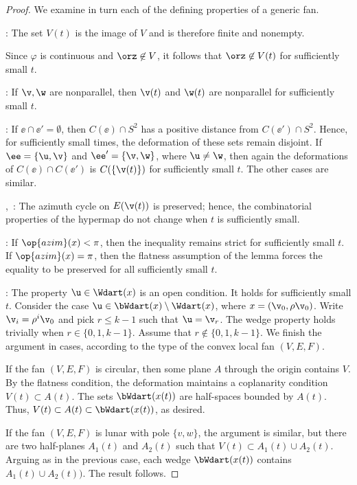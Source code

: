 \begin{proof} We examine in turn each of the defining properties of a generic fan.

: The set $V(t)$ is the image of $V$ and is
therefore finite and nonempty.

 Since $\varphi$ is continuous and
$\orz\not\in V$, it follows that $\orz\not\in V(t)$ for sufficiently
small $t$.

: If $\v,\w$ are nonparallel, then $\v(t)$ and
$\w(t)$ are nonparallel for sufficiently small $t$.

: If $\ee \cap \ee'=\emptyset$, then $C(\ee)\cap
S^2$ has a positive distance from $C(\ee')\cap S^2$.  Hence, for
sufficiently small times, the deformation of these sets remain
disjoint.  If $\ee=\{\u,\v\}$ and $\ee'=\{\v,\w\}$, where $\u\ne\w$,
then again the deformations of $C(\ee)\cap C(\ee')$ is
$C(\{\v(t)\})$ for sufficiently small $t$.  The other cases are
similar.

,~: The azimuth cycle on $E(\v(t))$
is preserved; hence, the combinatorial properties of the hypermap do
not change when $t$ is sufficiently small.

: If $\op{azim}(x)<\pi$, then the inequality remains
strict for sufficiently small $t$.  If $\op{azim}(x)=\pi$, then the
flatness assumption of the lemma forces the equality to be
preserved for all sufficiently small $t$.

: The property $\u\in \Wdart(x)$ is an open condition.
It holds for sufficiently small $t$. Consider the case $\u\in
\bWdart(x)\setminus \Wdart(x)$, where $x= (\v_0,\rho\v_0)$.  Write
$\v_i = \rho^i\v_0$ and pick $r\le k-1$ such that $\u = \v_r$.  The
wedge property holds trivially when $r\in\{0,1,k-1\}$. Assume that
$r\not\in\{0,1,k-1\}$.  We finish the argument in cases, according to 
the type of the convex local fan  $(V,E,F)$.

If the fan $(V,E,F)$ is circular, then some plane $A$ through
the origin  contains $V$.  By the flatness condition, the
deformation maintains a coplanarity condition $V(t)\subset A(t)$.  The
sets $\bWdart(x(t))$ are half-spaces bounded by $A(t)$.  Thus,
$V(t)\subset A(t)\subset \bWdart(x(t))$, as desired.

If the fan $(V,E,F)$ is lunar with pole $\{v,w\}$, the argument is
similar, but there are two half-planes $A_1(t)$ and $A_2(t)$ such that
$V(t)\subset A_1(t)\cup A_2(t)$.  Arguing as in the previous case,
each wedge $\bWdart(x(t))$ contains $A_1(t)\cup A_2(t))$.  The result
follows.


\end{proof}
